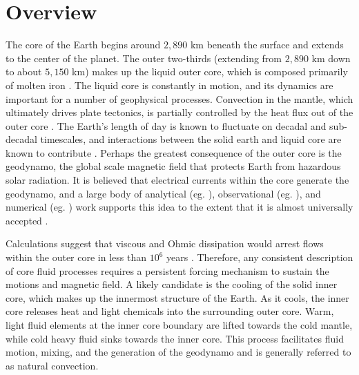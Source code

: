 \chapter{Overview}
\label{opening_remarks}
The core of the Earth begins around $2,890$ km beneath the surface and extends to the center of the planet. The outer two-thirds (extending from $2,890$ km down to about $5,150$ km) makes up the liquid outer core, which is composed primarily of molten iron \citep{lW20}. 
The liquid core is constantly in motion, and its dynamics are important for a number of geophysical processes. 
Convection in the mantle, which ultimately drives plate tectonics, is partially controlled by the heat flux out of the outer core \citep{gS01}. 
The Earth's length of day is known to fluctuate on decadal and sub-decadal timescales, and interactions between the solid earth and liquid core are known to contribute \citep{sP02,sZ97}.
Perhaps the greatest consequence of the outer core is the geodynamo, the global scale magnetic field that protects Earth from hazardous solar radiation.
It is believed that electrical currents within the core generate the geodynamo, and
a large body of analytical (eg. \citep{eP55,gR72}), observational (eg. \citep{cV84,aJ00}), and numerical (eg. \citep{gG95a,gG95b,uC06}) work supports this idea to the extent that it is almost universally accepted \citep{pR13}. 

Calculations suggest that viscous and Ohmic dissipation would arrest flows within the outer core in less than $10^{6}$ years \citep{aC98}. Therefore, any consistent description of core fluid processes requires a persistent forcing mechanism to sustain the motions and magnetic field.
A likely candidate is the cooling of the solid inner core, which makes up the innermost structure of the Earth. As it cools, the inner core releases heat and light chemicals into the surrounding outer core. 
Warm, light fluid elements at the inner core boundary are lifted towards the cold mantle, while cold heavy fluid sinks towards the inner core. 
This process facilitates fluid motion, mixing, and the generation of the geodynamo and is generally referred to as natural convection. 


